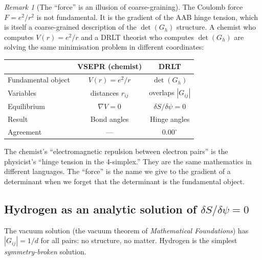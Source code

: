 \documentclass[12pt]{article}
\theoremstyle{remark}
\newtheorem{remark}[theorem]{Remark}
\theoremstyle{definition}
\begin{document}
\begin{remark}[The ``force'' is an illusion of coarse-graining]
The Coulomb force $F = e^2/r^2$ is not fundamental.  It is the gradient of the AAB hinge tension, which is itself a coarse-grained description of the $\det(G_h)$ structure.  A chemist who computes $V(r) = e^2/r$ and a DRLT theorist who computes $\det(G_h)$ are solving the same minimisation problem in different coordinates:
\begin{center}
\begin{tabular}{lcc}
\hline
& VSEPR (chemist) & DRLT \\
\hline
Fundamental object & $V(r) = e^2/r$ & $\det(G_h)$ \\
Variables & distances $r_{ij}$ & overlaps $|G_{ij}|$ \\
Equilibrium & $\nabla V = 0$ & $\delta S / \delta\psi = 0$ \\
Result & Bond angles & Hinge angles \\
Agreement & --- & $0.00^\circ$ \\
\hline
\end{tabular}
\end{center}
The chemist's ``electromagnetic repulsion between electron pairs'' is the physicist's ``hinge tension in the 4-simplex.''  They are the same mathematics in different languages.  The ``force'' is the name we give to the gradient of a determinant when we forget that the determinant is the fundamental object.
\end{remark}

\subsection{Hydrogen as an analytic solution of $\delta S/\delta\psi = 0$}
\label{sec:hydrogen_analytic}

The vacuum solution (the vacuum theorem of \textit{Mathematical Foundations}) has $|G_{ij}| = 1/d$ for all pairs: no structure, no matter.  Hydrogen is the simplest \emph{symmetry-broken} solution.
\end{document}
